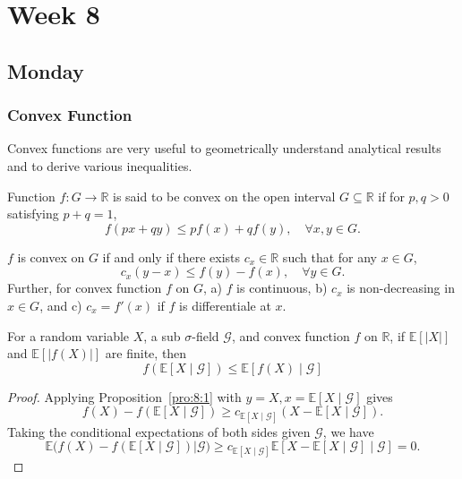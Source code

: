 
\chapter{Week 8}

\section{Monday}
\subsection{Convex Function}

Convex functions are very useful to geometrically understand analytical results and to derive various inequalities.

\begin{definition}[Convex]
Function $f:G\to\mathbb{R}$ is said to be convex on the open interval $G\subseteq\mathbb{R}$ if for $p,q>0$ satisfying $p+q=1$,
\[
f(px+qy)\le pf(x)+qf(y),\quad\forall x,y\in G.
\]
\end{definition}

\begin{proposition}\label{pro:8:1}
$f$ is convex on $G$ if and only if there exists $c_x\in\mathbb{R}$ such that for any $x\in G$, 
\[
c_x(y-x)\le f(y)-f(x),\quad\forall y\in G.
\]
Further, for convex function $f$ on $G$, a) $f$ is continuous, b) $c_x$ is non-decreasing in $x\in G$,
and c) $c_x=f'(x)$ if $f$ is differentiale at $x$.
\end{proposition}

\begin{proposition}\label{pro:8:2}
For a random variable $X$, a sub $\sigma$-field $\mathcal{G}$, and convex function $f$ on $\mathbb{R}$, if $\mathbb{E}[|X|]$ and $\mathbb{E}[|f(X)|]$ are finite, then
\[
f(\mathbb{E}[X\mid\mathcal{G}])\le \mathbb{E}[f(X)\mid\mathcal{G}]
\]
\end{proposition}
\begin{proof}
Applying Proposition~\ref{pro:8:1} with $y=X,x=\mathbb{E}[X\mid\mathcal{G}]$ gives
\[
f(X) - f(\mathbb{E}[X\mid\mathcal{G}])\ge c_{\mathbb{E}[X\mid\mathcal{G}]}(X - \mathbb{E}[X\mid\mathcal{G}]).
\]
Taking the conditional expectations of both sides given $\mathcal{G}$, we have
\[
\mathbb{E}\bigg(
f(X) - f(\mathbb{E}[X\mid\mathcal{G}])\bigg|\mathcal{G}
\bigg)\ge c_{\mathbb{E}[X\mid\mathcal{G}]}\mathbb{E}[X - \mathbb{E}[X\mid\mathcal{G}]\mid\mathcal{G}]=0.
\]

\end{proof}

